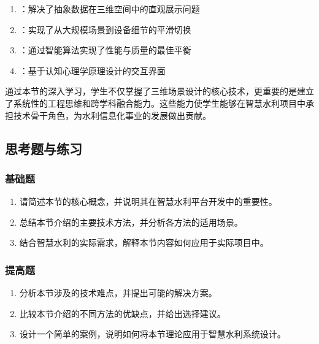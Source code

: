 \begin{enumerate}
\def\labelenumi{\arabic{enumi}.}
\tightlist
\item
  ：解决了抽象数据在三维空间中的直观展示问题
\item
  ：实现了从大规模场景到设备细节的平滑切换
\item
  ：通过智能算法实现了性能与质量的最佳平衡
\item
  ：基于认知心理学原理设计的交互界面
\end{enumerate}

通过本节的深入学习，学生不仅掌握了三维场景设计的核心技术，更重要的是建立了系统性的工程思维和跨学科融合能力。这些能力使学生能够在智慧水利项目中承担技术骨干角色，为水利信息化事业的发展做出贡献。

\hypertarget{ux601dux8003ux9898ux4e0eux7ec3ux4e60}{%
\subsection{思考题与练习}\label{ux601dux8003ux9898ux4e0eux7ec3ux4e60}}

\hypertarget{ux57faux7840ux9898}{%
\subsubsection{基础题}\label{ux57faux7840ux9898}}

\begin{enumerate}
\def\labelenumi{\arabic{enumi}.}
\tightlist
\item
  请简述本节的核心概念，并说明其在智慧水利平台开发中的重要性。
\item
  总结本节介绍的主要技术方法，并分析各方法的适用场景。
\item
  结合智慧水利的实际需求，解释本节内容如何应用于实际项目中。
\end{enumerate}

\hypertarget{ux63d0ux9ad8ux9898}{%
\subsubsection{提高题}\label{ux63d0ux9ad8ux9898}}

\begin{enumerate}
\def\labelenumi{\arabic{enumi}.}
\tightlist
\item
  分析本节涉及的技术难点，并提出可能的解决方案。
\item
  比较本节介绍的不同方法的优缺点，并给出选择建议。
\item
  设计一个简单的案例，说明如何将本节理论应用于智慧水利系统设计。
\end{enumerate}

